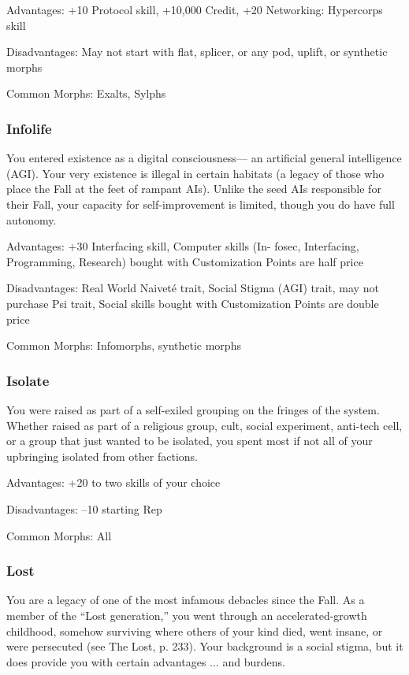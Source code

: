  Advantages: +10 Protocol skill, +10,000 Credit, +20
 Networking: Hypercorps skill

 Disadvantages: May not start with flat, splicer, or any
 pod, uplift, or synthetic morphs

 Common Morphs: Exalts, Sylphs

\subsubsection{Infolife} %
 You entered existence as a digital consciousness—
 an artificial general intelligence (AGI). Your very
 existence is illegal in certain habitats (a legacy of
 those who place the Fall at the feet of rampant AIs).
 Unlike the seed AIs responsible for their Fall, your
 capacity for self-improvement is limited, though you
 do have full autonomy.
 
 Advantages: +30 Interfacing skill, Computer skills (In-
 fosec, Interfacing, Programming, Research) bought
 with Customization Points are half price
 
 Disadvantages: Real World Naiveté trait, Social Stigma
 (AGI) trait, may not purchase Psi trait, Social skills
 bought with Customization Points are double price
 
 Common Morphs: Infomorphs, synthetic morphs

\subsubsection{Isolate} %
 You were raised as part of a self-exiled grouping on
 the fringes of the system. Whether raised as part of
 a religious group, cult, social experiment, anti-tech
 cell, or a group that just wanted to be isolated, you
 spent most if not all of your upbringing isolated
 from other factions.
 
 Advantages: +20 to two skills of your choice
 
 Disadvantages: –10 starting Rep
 
 Common Morphs: All

\subsubsection{Lost} %
 You are a legacy of one of the most infamous debacles
 since the Fall. As a member of the “Lost generation,”
 you went through an accelerated-growth childhood,
 somehow surviving where others of your kind died,
 went insane, or were persecuted (see The Lost, p. 233).
 Your background is a social stigma, but it does provide
 you with certain advantages ... and burdens.
 
